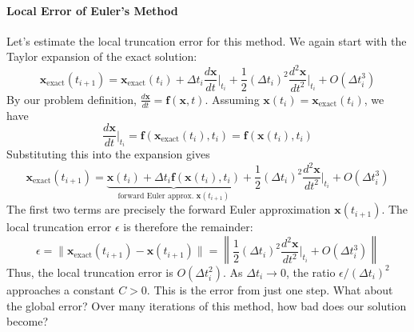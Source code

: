\paragraph*{Local Error of Euler's Method}

Let's estimate the local truncation error for this method. We again start with the Taylor expansion of the exact solution:
\begin{equation}
    \mathbf{x}_{\text{exact}}(t_{i+1}) = \mathbf{x}_{\text{exact}}(t_i) + \Delta t_i \frac{d\mathbf{x}}{dt}\bigg|_{t_i} + \frac{1}{2}(\Delta t_i)^2 \frac{d^2\mathbf{x}}{dt^2}\bigg|_{t_i} + O(\Delta t_i^3)
\end{equation}
By our problem definition, $\frac{d\mathbf{x}}{dt} = \mathbf{f}(\mathbf{x}, t)$. Assuming $\mathbf{x}(t_i) = \mathbf{x}_{\text{exact}}(t_i)$, we have
\begin{equation}
    \frac{d\mathbf{x}}{dt}\bigg|_{t_i} = \mathbf{f}(\mathbf{x}_{\text{exact}}(t_i), t_i) = \mathbf{f}(\mathbf{x}(t_i), t_i)
\end{equation}
Substituting this into the expansion gives
\begin{equation}
    \mathbf{x}_{\text{exact}}(t_{i+1}) = \underbrace{\mathbf{x}(t_i) + \Delta t_i \mathbf{f}(\mathbf{x}(t_i), t_i)}_{\text{forward Euler approx. } \mathbf{x}(t_{i+1})} + \frac{1}{2}(\Delta t_i)^2 \frac{d^2\mathbf{x}}{dt^2}\bigg|_{t_i} + O(\Delta t_i^3)
\end{equation}
The first two terms are precisely the forward Euler approximation $\mathbf{x}(t_{i+1})$. The local truncation error $\epsilon$ is therefore the remainder:
\begin{equation}
    \epsilon = \| \mathbf{x}_{\text{exact}}(t_{i+1}) - \mathbf{x}(t_{i+1}) \| = \left\| \frac{1}{2}(\Delta t_i)^2 \frac{d^2\mathbf{x}}{dt^2}\bigg|_{t_i} + O(\Delta t_i^3) \right\|
\end{equation}
Thus, the local truncation error is $O(\Delta t_i^2)$. As $\Delta t_i \to 0$, the ratio $\epsilon / (\Delta t_i)^2$ approaches a constant $C > 0$. This is the error from just one step. What about the global error? Over many iterations of this method, how bad does our solution become?

